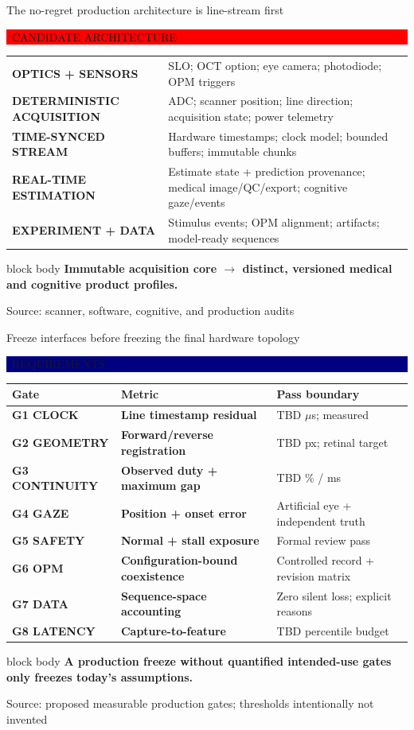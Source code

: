 \documentclass[aspectratio=169,9pt,xcolor=table]{beamer}
\newcommand{\evidence}[2]{%
  \vspace{-0.06cm}\hfill
  \colorbox{#2}{\color{white}\bfseries\scriptsize\strut\ #1\ }\par
  \vspace{0.04cm}
}
\newcommand{\source}[1]{\vfill{\color{Mid}\tiny Source: #1}}
\newcommand{\takeaway}[1]{%
  \begin{beamercolorbox}[rounded=true,sep=0.10cm,wd=\textwidth]{block body}
    \color{Navy}\bfseries #1
  \end{beamercolorbox}
}
\begin{document}
\begin{frame}{The no-regret production architecture is line-stream first}
  \evidence{CANDIDATE ARCHITECTURE}{Red}
  \begin{center}
  \renewcommand{\arraystretch}{1.35}
  \begin{tabularx}{0.92\textwidth}{>{\bfseries\color{Navy}}p{} X}
    \rowcolor{PaleBlue} OPTICS + SENSORS &
      SLO; OCT option; eye camera; photodiode; OPM triggers\\
    \rowcolor{PaleTeal} DETERMINISTIC ACQUISITION &
      ADC; scanner position; line direction; acquisition state; power telemetry\\
    \rowcolor{PaleBlue} TIME-SYNCED STREAM &
      Hardware timestamps; clock model; bounded buffers; immutable chunks\\
    \rowcolor{PaleTeal} REAL-TIME ESTIMATION &
      Estimate state + prediction provenance; medical image/QC/export; cognitive gaze/events\\
    \rowcolor{PaleAmber} EXPERIMENT + DATA &
      Stimulus events; OPM alignment; artifacts; model-ready sequences\\
  \end{tabularx}
  \end{center}
  \vspace{0.35cm}
  \takeaway{Immutable acquisition core $\longrightarrow$ distinct, versioned medical and cognitive product profiles.}
  \source{scanner, software, cognitive, and production audits}
\end{frame}

\begin{frame}{Freeze interfaces before freezing the final hardware topology}
  \evidence{REQUIREMENTS}{Navy}
  \scriptsize
  \renewcommand{\arraystretch}{1.4}
  \begin{tabularx}{\textwidth}{>{\bfseries\color{Teal}}l >{\bfseries}l X}
    \toprule
    Gate & Metric & Pass boundary\\
    \midrule
    G1 CLOCK & Line timestamp residual & TBD $\mu$s; measured\\
    G2 GEOMETRY & Forward/reverse registration & TBD px; retinal target\\
    G3 CONTINUITY & Observed duty + maximum gap & TBD \% / ms\\
    G4 GAZE & Position + onset error & Artificial eye + independent truth\\
    G5 SAFETY & Normal + stall exposure & Formal review pass\\
    G6 OPM & Configuration-bound coexistence & Controlled record + revision matrix\\
    G7 DATA & Sequence-space accounting & Zero silent loss; explicit reasons\\
    G8 LATENCY & Capture-to-feature & TBD percentile budget\\
    \bottomrule
  \end{tabularx}
  \vspace{0.3cm}
  \takeaway{A production freeze without quantified intended-use gates only freezes today's assumptions.}
  \source{proposed measurable production gates; thresholds intentionally not invented}
\end{frame}
\end{document}
